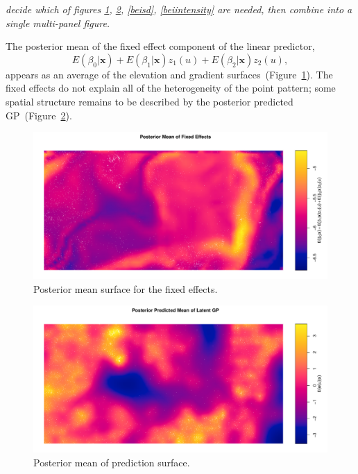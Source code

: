 \documentclass[]{interact}
\begin{document}
{\it decide which of figures \ref{beibetas}, \ref{beimean}, \ref{beisd},
\ref{beiintensity} are needed, then combine into a single multi-panel figure.}

The posterior mean of the fixed effect component of the linear predictor,
\begin{displaymath}
E(\beta_{0} | \mathbf{x}) + E(\beta_{1} | \mathbf{x}) z_{1}(u)
+ E(\beta_{2} | \mathbf{x}) z_{2}(u),
\end{displaymath}
appears as an average of the elevation and gradient
surfaces~(Figure~\ref{beibetas}). The fixed effects do not explain all of the
heterogeneity of the point pattern; some spatial structure remains to be
described by the posterior predicted GP~(Figure~\ref{beimean}).

\begin{figure}[h]
\includegraphics[width=\textwidth]{figures/bei_betas.pdf}
\caption{Posterior mean surface for the fixed effects.}
\label{beibetas}
\end{figure}

\begin{figure}[h]
\includegraphics[width=\textwidth]{figures/bei_mean.pdf}
\caption{Posterior mean of prediction surface.}
\label{beimean}
\end{figure}
\end{document}
